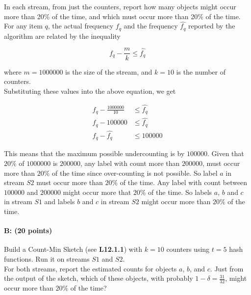 \documentclass[11pt]{article}
\begin{document}
In each stream, from just the counters, report how many objects might occur more than 20\% of the time, and which must occur more than 20\% of the time. \\

For any item $q$, the actual frequency $f_q$ and the frequency $\hat{f_q}$ reported by the algorithm are related by the inequality

$$
f_q - \frac{m}{k} \leq \hat{f_q}
$$

where $m=\num[group-separator={,}]{1000000}$ is the size of the stream, and $k=10$ is the number of counters.\\
Substituting these values into the above equation, we get

\begin{equation*}
\begin{aligned}
f_q - \frac{\num[group-separator={,}]{1000000}}{10} &\leq \hat{f_q}\\
f_q - \num[group-separator={,}]{100000} &\leq \hat{f_q}\\
f_q - \hat{f_q}  &\leq \num[group-separator={,}]{100000}
\end{aligned}
\end{equation*}

This means that the maximum possible undercounting is by $\num[group-separator={,}]{100000}$. Given that $20\%$ of $\num[group-separator={,}]{1000000}$ is $\num[group-separator={,}]{200000}$, any label with count more than $\num[group-separator={,}]{200000}$, must occur more than $20\%$ of the time since over-counting is not possible. So label $a$ in stream $S2$ must occur more than $20\%$ of the time. Any label with count between $\num[group-separator={,}]{100000}$ and $\num[group-separator={,}]{200000}$ might occur more that $20\%$ of the time. So labels $a$, $b$ and $c$ in stream $S1$ and labels $b$ and $c$ in stream $S2$ might occur more than $20\%$ of the time.

\paragraph{B: (20 points)}  
Build a Count-Min Sketch (see \textbf{L12.1.1}) with $k = 10$ counters using $t = 5$ hash functions. Run it on streams $S1$ and $S2$.\\
For both streams, report the estimated counts for objects $a$, $b$, and $c$. Just from the output of the sketch, which of these objects, with probably $1 - \delta = \frac{31}{32}$, might occur more than $20\%$ of the time?\\
\end{document}
